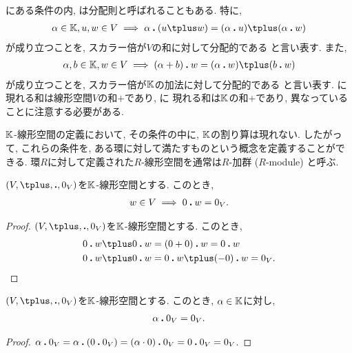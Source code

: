 \begin{remark}
にある条件の内,
は分配則と呼ばれることもある.
特に, 
\begin{align*}
\alpha\in \KK,u,w\in V \implies \alpha\act (u\plus w)=(\alpha\act u)\plus (\alpha\act w)
\end{align*}
が成り立つことを, スカラー倍が$V$の和に対して分配的である
と言い表す.
また,  
\begin{align*}
\alpha,b\in\KK, w\in V\implies (\alpha+b)\act w=(\alpha\act w)\plus (b\act w)
\end{align*}
が成り立つことを, スカラー倍が$\mathbb{K}$の加法に対して分配的である
と言い表す.
に
現れる和は線形空間$V$の和$\plus$であり,
 に
現れる和は$\mathbb{K}$の和$+$であり,
異なっていることに注意する必要がある.
\end{remark}

\begin{remark}
  $\mathbb{K}$-線形空間の定義において,
  その条件の中に, $\mathbb{K}$の割り算は現れない.
  したがって,
  これらの条件を, ある環に対して満たすものという概念を定義することができる.
  環$R$に対して定義された$R$-線形空間を通常は$R$-加群 ($R$-module) と呼ぶ.
\end{remark}

\begin{prop}
  \label{prop:zeroveciszeroscalar}
  $(V,\plus ,\act ,0_V)$を$\mathbb{K}$-線形空間とする.
  このとき,
  \begin{align*}
    w\in V \implies 0\mathbin{\boldsymbol{.}} w=0_V. 
  \end{align*}
\end{prop}
\begin{proof}
$(V,\plus,\act,0_V)$を$\mathbb{K}$-線形空間とする.
  このとき,
  \begin{align*}
    0\act w\plus 0\act w&=(0+0)\act w=0\act w\\
    0\act w\plus 0\act w&=0\act w\plus (-0)\act w=0_V.
  \end{align*}
\end{proof}
\begin{prop}
$(V,\plus ,\act ,0_V)$を$\mathbb{K}$-線形空間とする.
このとき, $\alpha \in\mathbb{K}$に対し,
\begin{align*}
\alpha \mathbin{\boldsymbol{.}} 0_V = 0_V.
\end{align*}
\end{prop}
\begin{proof}
$\alpha \mathbin{\boldsymbol{.}} 0_V = \alpha \mathbin{\boldsymbol{.}} (0\mathbin{\boldsymbol{.}} 0_V)= (\alpha \cdot 0)\mathbin{\boldsymbol{.}} 0_V=0\mathbin{\boldsymbol{.}} 0_V=0_V$.
\end{proof}


